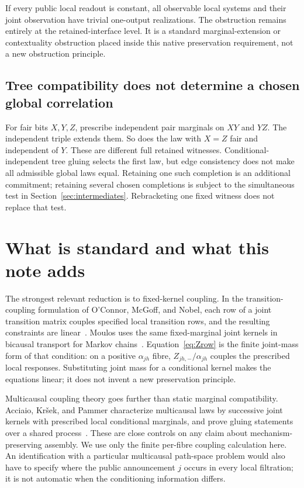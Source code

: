 \documentclass[11pt]{article}
\theoremstyle{remark}
\begin{document}
If every public local readout is constant, all observable local systems and their joint observation have trivial one-output realizations. The obstruction remains entirely at the retained-interface level. It is a standard marginal-extension or contextuality obstruction placed inside this native preservation requirement, not a new obstruction principle.

\subsection{Tree compatibility does not determine a chosen global correlation}

For fair bits $X,Y,Z$, prescribe independent pair marginals on $XY$ and $YZ$. The independent triple extends them. So does the law with $X=Z$ fair and independent of $Y$. These are different full retained witnesses. Conditional-independent tree gluing selects the first law, but edge consistency does not make all admissible global laws equal. Retaining one such completion is an additional commitment; retaining several chosen completions is subject to the simultaneous test in Section~\ref{sec:intermediates}. Rebracketing one fixed witness does not replace that test.

\section{What is standard and what this note adds}\label{sec:prior-art}

The strongest relevant reduction is to fixed-kernel coupling. In the transition-coupling formulation of O'Connor, McGoff, and Nobel, each row of a joint transition matrix couples specified local transition rows, and the resulting constraints are linear~\cite{OConnor2022}. Moulos uses the same fixed-marginal joint kernels in bicausal transport for Markov chains~\cite{Moulos2020}. Equation~\eqref{eq:Zrow} is the finite joint-mass form of that condition: on a positive $\alpha_{jh}$ fibre, $Z_{jh,-}/\alpha_{jh}$ couples the prescribed local responses. Substituting joint mass for a conditional kernel makes the equations linear; it does not invent a new preservation principle.

Multicausal coupling theory goes further than static marginal compatibility. Acciaio, Kr\v sek, and Pammer characterize multicausal laws by successive joint kernels with prescribed local conditional marginals, and prove gluing statements over a shared process~\cite{Acciaio2025}. These are close controls on any claim about mechanism-preserving assembly. We use only the finite per-fibre coupling calculation here. An identification with a particular multicausal path-space problem would also have to specify where the public announcement $j$ occurs in every local filtration; it is not automatic when the conditioning information differs.
\end{document}
